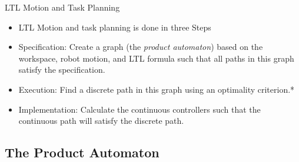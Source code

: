 \documentclass{beamer}
\begin{document}
\begin{frame}{LTL Motion and Task Planning}
	\begin{itemize}	
	\item {
		LTL Motion and task planning is done in three Steps \cite{belta07}
		\pause
	}
	\item<2->{
		Specification: Create a graph (the \textit{product automaton}) based on the workspace, robot motion, and LTL formula such that all paths in this graph satisfy the specification.
	}
	\item<3->{
		Execution: Find a discrete path in this graph using an optimality criterion.*
	}
	\item<4->{
		Implementation: Calculate the continuous controllers such that the continuous path will satisfy the discrete path.
	}
	\end{itemize}	
	
\end{frame}
\subsection{The Product Automaton}
\end{document}
